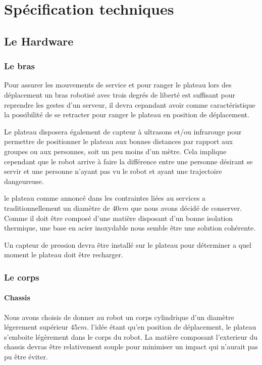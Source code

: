 \chapter{Spécification techniques}

\section{Le Hardware}

\subsection{Le bras}

Pour assurer les mouvements de service et pour ranger le plateau lors
des déplacement un bras robotisé avec trois degrés de liberté est
suffisant pour reprendre les gestes d'un serveur, il devra cepandant
avoir comme caractéristique la possibilité de se retracter pour ranger
le plateau en position de déplacement.

Le plateau disposera également de capteur à ultrasons et/ou infrarouge
pour permettre de positionner le plateau aux bonnes distances par
rapport aux groupes ou aux personnes, soit un peu moins d'un mètre.
Cela implique cependant que le robot arrive à faire la différence entre 
une personne désirant se servir et une personne n'ayant pas vu le robot 
et ayant une trajectoire dangeureuse.

le plateau comme annoncé dans les contraintes liées au services a
traditionnellement un diamètre de $40cm$ que nous avons décidé de
conserver. Comme il doit être composé d'une matière disposant d'un
bonne isolation thermique, une base en acier inoxydable nous semble
être une solution cohérente.

Un capteur de pression devra être installé sur le plateau pour déterminer 
a quel moment le plateau doit être recharger.

\subsection{Le corps}

\subsubsection{Chassis}
Nous avons choisis de donner au robot un corps cylindrique d'un
diamètre légerement supérieur $45cm$. l'idée étant qu'en position de
déplacement, le plateau s'emboite légèrement dans le corps du robot.
La matière composant l'exterieur du chassis devras être relativement
souple pour minimiser un impact qui n'aurait pas pu être éviter. 

